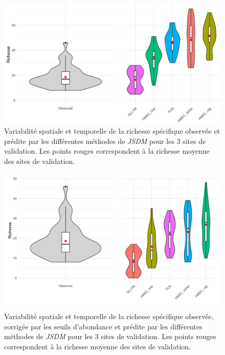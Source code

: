 \documentclass[12pt,]{article}
\makeatletter
\def\maxwidth{\ifdim\Gin@nat@width>\linewidth\linewidth
\else\Gin@nat@width\fi}
\let\Oldincludegraphics\includegraphics
\renewcommand{\includegraphics}[1]{\Oldincludegraphics[width=\maxwidth]{#1}}
\makeatother
\begin{document}
\begin{figure}
\hypertarget{fig:predoccbrt}{%
\centering
\includegraphics{figures/occurence_brt.png}
\caption{Variabilité spatiale et temporelle de la richesse spécifique
observée et prédite par les différentes méthodes de \emph{JSDM} pour les
3 sites de validation. Les points rouges correspondent à la richesse
moyenne des sites de validation.}\label{fig:predoccbrt}
}
\end{figure}

\begin{figure}
\hypertarget{fig:predocccorr}{%
\centering
\includegraphics{figures/occurence_corr.png}
\caption{Variabilité spatiale et temporelle de la richesse spécifique
observée, corrigée par les seuils d'abondance et prédite par les
différentes méthodes de \emph{JSDM} pour les 3 sites de validation. Les
points rouges correspondent à la richesse moyenne des sites de
validation.}\label{fig:predocccorr}
}
\end{figure}
\end{document}
